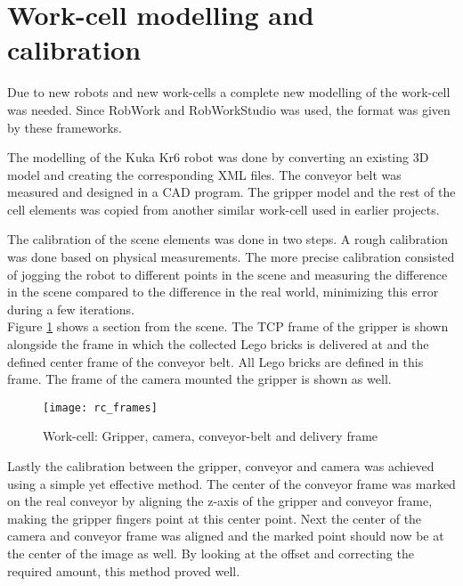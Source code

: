 \section{Work-cell modelling and calibration}
\label{sec:workcell}
Due to new robots and new work-cells a complete new modelling of the work-cell was needed. Since RobWork and RobWorkStudio was used, the format was given by these frameworks. 

The modelling of the Kuka Kr6 robot was done by converting an existing 3D model and creating the corresponding XML files. The conveyor belt was measured and designed in a CAD program. The gripper model and the rest of the cell elements was copied from another similar work-cell used in earlier projects. 

The calibration of the scene elements was done in two steps. A rough calibration was done based on physical measurements. The more precise calibration consisted of jogging the robot to different points in the scene and measuring the difference in the scene compared to the difference in the real world, minimizing this error during a few iterations. \\

Figure \ref{fig:rc_frames} shows a section from the scene. The TCP frame of the gripper is shown alongside the frame in which the collected Lego bricks is delivered at and the defined center frame of the conveyor belt. All Lego bricks are defined in this frame. The frame of the camera mounted the gripper is shown as well. 

	\begin{figure}[H]
		\centering
	    \texttt{[image: rc\_frames]}
	    \caption{Work-cell: Gripper, camera, conveyor-belt and delivery frame}
		\label{fig:rc_frames}
	\end{figure}
	
Lastly the calibration between the gripper, conveyor and camera was achieved using a simple yet effective method. The center of the conveyor frame was marked on the real conveyor by aligning the z-axis of the gripper and conveyor frame, making the gripper fingers point at this center point. Next the center of the camera and conveyor frame was aligned and the marked point should now be at the center of the image as well. By looking at the offset and correcting the required amount, this method proved well.  